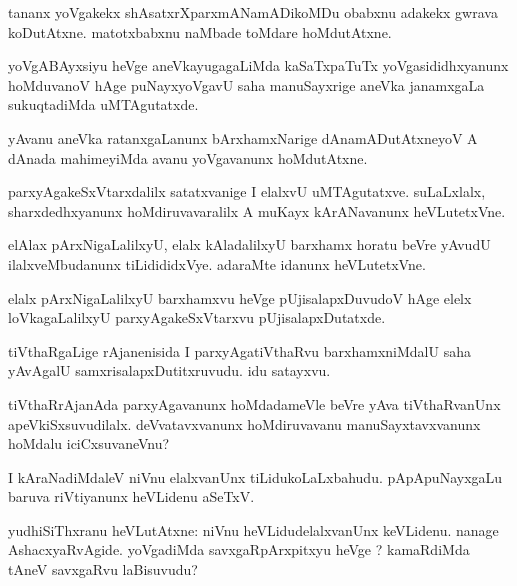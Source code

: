 \documentclass{article}
\begin{document}
\begin{mn}
tananx yoVgakekx shAsatxrXparxmANamADikoMDu obabxnu adakekx gwrava koDutAtxne. matotxbabxnu 
naMbade toMdare hoMdutAtxne.
\end{mn}

\begin{mn}
yoVgABAyxsiyu heVge aneVkayugagaLiMda kaSaTxpaTuTx yoVgasididhxyanunx hoMduvanoV hAge 
puNayxyoVgavU saha manuSayxrige aneVka janamxgaLa sukuqtadiMda uMTAgutatxde.
\end{mn}

\begin{mn}
yAvanu aneVka ratanxgaLanunx bArxhamxNarige dAnamADutAtxneyoV A dAnada mahimeyiMda avanu 
yoVgavanunx hoMdutAtxne.
\end{mn}

\begin{mn}
parxyAgakeSxVtarxdalilx satatxvanige I elalxvU uMTAgutatxve. suLaLxlalx, sharxdedhxyanunx 
hoMdiruvavaralilx A muKayx kArANavanunx heVLutetxVne.
\end{mn}

\begin{mn}
elAlax pArxNigaLalilxyU, elalx kAladalilxyU  barxhamx horatu beVre yAvudU ilalxveMbudanunx 
tiLidididxVye. adaraMte idanunx heVLutetxVne.
\end{mn}

\begin{mn}
elalx pArxNigaLalilxyU barxhamxvu heVge pUjisalapxDuvudoV hAge elelx loVkagaLalilxyU 
parxyAgakeSxVtarxvu pUjisalapxDutatxde.
\end{mn}

\begin{mn}
tiVthaRgaLige rAjanenisida I parxyAgatiVthaRvu barxhamxniMdalU saha yAvAgalU 
samxrisalapxDutitxruvudu. idu satayxvu.
\end{mn}

\begin{mn}
tiVthaRrAjanAda parxyAgavanunx hoMdadameVle beVre yAva tiVthaRvanUnx apeVkiSxsuvudilalx. 
deVvatavxvanunx hoMdiruvavanu manuSayxtavxvanunx hoMdalu iciCxsuvaneVnu?
\end{mn}

\begin{mn}
I kAraNadiMdaleV niVnu elalxvanUnx tiLidukoLaLxbahudu. pApApuNayxgaLu baruva riVtiyanunx 
heVLidenu aSeTxV.
\end{mn}

\begin{mn}
yudhiSiThxranu heVLutAtxne: niVnu heVLidudelalxvanUnx keVLidenu. nanage AshacxyaRvAgide. 
yoVgadiMda savxgaRpArxpitxyu heVge ? kamaRdiMda tAneV savxgaRvu laBisuvudu?
\end{mn}
\end{document}
